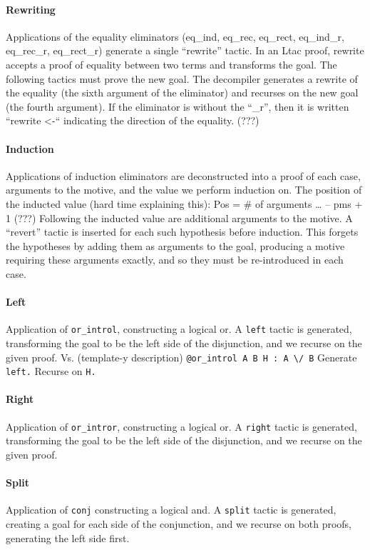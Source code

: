\paragraph{Rewriting}
Applications of the equality eliminators (eq_ind, eq_rec, eq_rect, eq_ind_r, eq_rec_r, eq_rect_r) generate a single “rewrite” tactic. In an Ltac proof, rewrite accepts a proof of equality between two terms and transforms the goal. The following tactics must prove the new goal. The decompiler generates a rewrite of the equality (the sixth argument of the eliminator) and recurses on the new goal (the fourth argument). If the eliminator is without the “_r”, then it is written “rewrite <-“ indicating the direction of the equality. (???)

\paragraph{Induction}
Applications of induction eliminators are deconstructed into a proof of each case, arguments to the motive, and the value we perform induction on.
The position of the inducted value (hard time explaining this): Pos = \# of arguments … – pms + 1 (???)
Following the inducted value are additional arguments to the motive. A “revert” tactic is inserted for each such hypothesis before induction. This forgets the hypotheses by adding them as arguments to the goal, producing a motive requiring these arguments exactly, and so they must be re-introduced in each case.

\paragraph{Left}
Application of \lstinline{or_introl}, constructing a logical or. A \lstinline{left} tactic is generated, transforming the goal to be the left side of the disjunction, and we recurse on the given proof.
Vs. (template-y description)
\lstinline{@or_introl A B H : A \/ B}
Generate \lstinline{left.}
Recurse on \lstinline{H.}

\paragraph{Right}
Application of \lstinline{or_intror}, constructing a logical or. A \lstinline{right} tactic is generated, transforming the goal to be the left side of the disjunction, and we recurse on the given proof.

\paragraph{Split}
Application of \lstinline{conj} constructing a logical and. A \lstinline{split} tactic is generated, creating a goal for each side of the conjunction, and we recurse on both proofs, generating the left side first.

